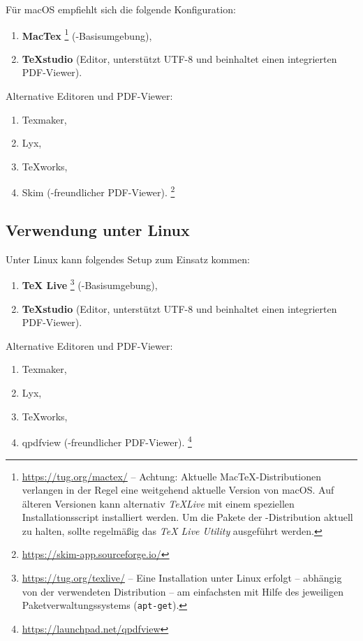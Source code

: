 Für macOS empfiehlt sich die folgende Konfiguration:
%
\begin{enumerate}
\item 
	\textbf{MacTex}%
	\footnote{\url{https://tug.org/mactex/} -- Achtung: Aktuelle
	MacTeX-Distributionen verlangen in der Regel eine weitgehend aktuelle Version
	von macOS. Auf älteren Versionen kann alternativ \emph{TeXLive} mit einem
	speziellen Installationsscript installiert werden. Um die Pakete der
	\latex-Distribution aktuell zu halten, sollte regelmäßig das \emph{TeX Live
	Utility} ausgeführt werden.}
	(\latex-Basisumgebung),
\item \textbf{TeXstudio} (Editor, unterstützt UTF-8 und beinhaltet einen
integrierten PDF-Viewer).
\end{enumerate}
%
Alternative Editoren und PDF-Viewer:
%
\begin{enumerate}
	\item Texmaker,%
	\item Lyx,%
	\item TeXworks,%
	\item Skim (\latex-freundlicher PDF-Viewer).%
	\footnote{\url{https://skim-app.sourceforge.io/}}
\end{enumerate}


\subsection{Verwendung unter Linux}

Unter Linux kann folgendes Setup zum Einsatz kommen:
%
\begin{enumerate}
	\item 
	\textbf{TeX Live}%
	\footnote{\url{https://tug.org/texlive/} -- Eine Installation unter Linux
	erfolgt -- abhängig von der verwendeten Distribution -- am einfachsten mit
	Hilfe des jeweiligen Paketverwaltungssystems (\zB \texttt{apt-get}).}
	(\latex-Basisumgebung),
	\item \textbf{TeXstudio} (Editor, unterstützt UTF-8 und beinhaltet einen
	integrierten PDF-Viewer).
\end{enumerate}
%
Alternative Editoren und PDF-Viewer:
%
\begin{enumerate}
	\item Texmaker,%
	\item Lyx,%
	\item TeXworks,%
	\item qpdfview (\latex-freundlicher PDF-Viewer).%
	\footnote{\url{https://launchpad.net/qpdfview}}
\end{enumerate}

